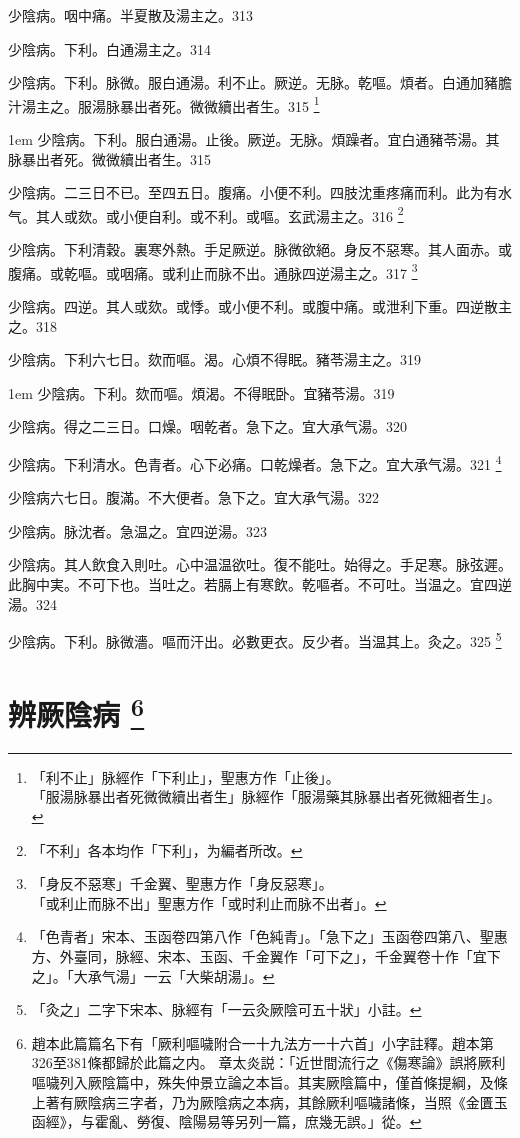 少陰病。咽中痛。半夏散及湯主之。313

少陰病。下利。白通湯主之。314

少陰病。下利。脉微。服白通湯。利不止。厥逆。无脉。乾嘔。煩者。白通加豬膽汁湯主之。服湯脉暴出者死。微{\khaaitp 微}續{\khaaitp 出}者生。315
	\footnote{「利不止」脉經作「下利止」，聖惠方作「止後」。\\「服湯脉暴出者死微微續出者生」脉經作「服湯藥其脉暴出者死微細者生」。}

\hangindent 1em
少陰病。下利。服白通湯。止後。厥逆。无脉。煩躁者。宜白通豬苓湯。其脉暴出者死。微微續出者生。{\gaoben}315

少陰病。二三日不已。至四五日。腹痛。小便不利。四肢沈重疼痛而利。此为有水气。其人或欬。或小便{\khaaitp 自}利。或不利。或嘔。玄武湯主之。316
	\footnote{「不利」各本均作「下利」，为編者所改。}

少陰病。下利清穀。裏寒外熱。手足厥逆。脉微欲絕。身反不惡寒。其人面赤。或腹痛。或乾嘔。或咽痛。或利止{\khaaitp 而}脉不出。通脉四逆湯主之。317
	\footnote{「身反不惡寒」千金翼、聖惠方作「身反惡寒」。\\「或利止而脉不出」聖惠方作「或时利止而脉不出者」。}

少陰病。四逆。其人或欬。或悸。或小便不利。或腹中痛。或泄利下重。四逆散主之。318

少陰病。下利六七日。欬而嘔。渴。心煩不得眠。豬苓湯主之。319

\hangindent 1em
少陰病。下利。欬而嘔。煩渴。不得眠卧。宜豬苓湯。{\gaoben}319

少陰病。得之二三日。口燥。咽乾者。急下之。宜{\khaaitp 大}承气湯。320

少陰病。{\khaaitp 下}利清水。色青者。心下必痛。口乾燥者。急下之。宜{\khaaitp 大}承气湯。321
	\footnote{
		「色青者」宋本、玉函卷四第八作「色純青」。「急下之」玉函卷四第八、聖惠方、外臺同，脉經、宋本、玉函、千金翼作「可下之」，千金翼卷十作「宜下之」。「大承气湯」一云「大柴胡湯」。
	}

少陰病六七日。腹滿。不大便者。急下之。宜{\khaaitp 大}承气湯。322

少陰病。脉沈者。急温之。宜四逆湯。323

少陰病。其人飲食入則吐。心中温温欲吐。復不能吐。始得之。手足寒。脉弦遲。此胸中実。不可下也。当吐之。若膈上有寒飲。乾嘔者。不可吐。当温之。宜四逆湯。324

少陰病。下利。脉微濇。嘔而汗出。必數更衣。反少者。当温其上。灸之。325
	\footnote{「灸之」二字下宋本、脉經有「一云灸厥陰可五十狀」小註。}

\chapter{辨厥陰病
	\footnote{
		趙本此篇篇名下有「厥利嘔噦附合一十九法方一十六首」小字註釋。趙本第326至381條都歸於此篇之内。
		章太炎説：「近世間流行之《傷寒論》誤將厥利嘔噦列入厥陰篇中，殊失仲景立論之本旨。其実厥陰篇中，僅首條提綱，及條上著有厥陰病三字者，乃为厥陰病之本病，其餘厥利嘔噦諸條，当照《金匱玉函經》，与霍亂、勞復、陰陽易等另列一篇，庶幾无誤。」從。
	}
}

